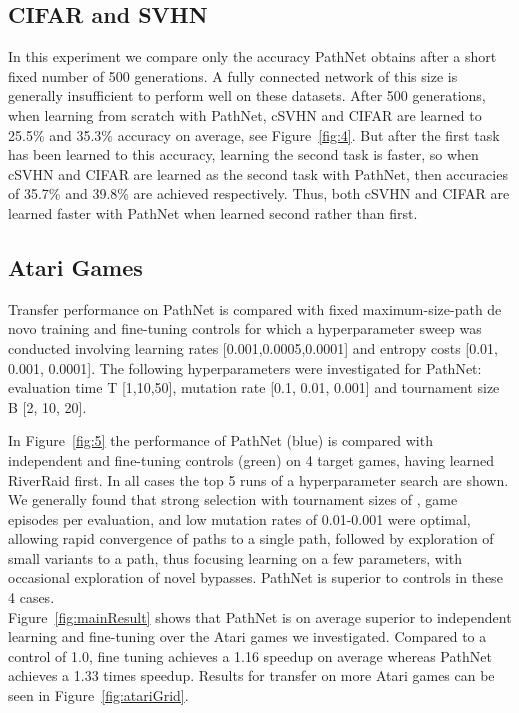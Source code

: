 \documentclass{sig-alternate-05-2015}
\begin{document}
\subsection{CIFAR and SVHN} 
In this experiment we compare only the accuracy PathNet obtains after a short fixed number of 500 generations. A fully connected network of this size is generally insufficient to perform well on these datasets. After 500 generations, when learning from scratch with PathNet, cSVHN and CIFAR are learned to 25.5\% and 35.3\% accuracy on average, see Figure~\ref{fig:4}. But after the first task has been learned to this accuracy, learning the second task is faster, so when cSVHN and CIFAR are learned as the second task with PathNet, then accuracies of 35.7\% and 39.8\% are achieved respectively. Thus, both cSVHN and CIFAR are learned faster with PathNet when learned second rather than first. 

\subsection{Atari Games} 
Transfer performance on PathNet is compared with fixed maximum-size-path de novo training and fine-tuning controls for which a hyperparameter sweep was conducted involving learning rates [0.001,0.0005,0.0001] and entropy costs [0.01, 0.001, 0.0001]. The following hyperparameters were investigated for PathNet: evaluation time T [1,10,50], mutation rate [0.1, 0.01, 0.001] and tournament size B [2, 10, 20].   

In Figure~\ref{fig:5} the performance of PathNet (blue) is compared with independent and fine-tuning controls (green) on 4 target games, having learned RiverRaid first. In all cases the top 5 runs of a hyperparameter search are shown. We generally found that strong selection with tournament sizes of ,  game episodes per evaluation, and low mutation rates of 0.01-0.001 were optimal, allowing rapid convergence of paths to a single path, followed by exploration of small variants to a path, thus focusing learning on a few parameters, with occasional exploration of novel bypasses. PathNet is superior to controls in these 4 cases.  \\

Figure~\ref{fig:mainResult} shows that PathNet is on average superior to independent learning and fine-tuning over the Atari games we investigated. Compared to a control of 1.0, fine tuning achieves a 1.16 speedup on average whereas PathNet achieves a 1.33 times speedup. Results for transfer on more Atari games can be seen in Figure~\ref{fig:atariGrid}. \\
\end{document}
